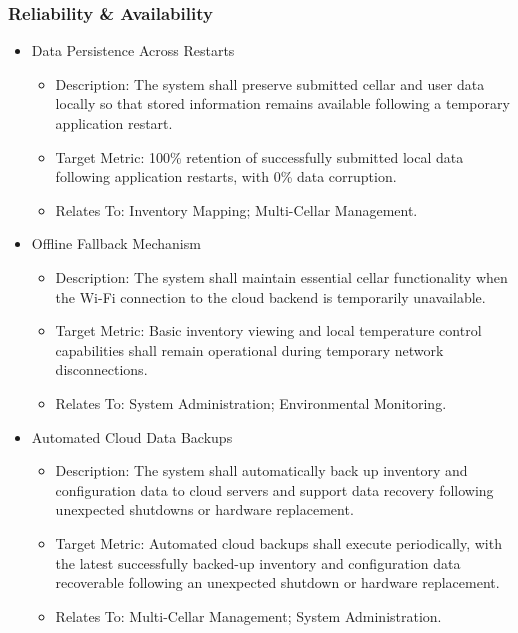 \documentclass[conference]{IEEEtran}
\begin{document}
\subsubsection{Reliability \& Availability}
\begin{itemize}
    \item Data Persistence Across Restarts
    \begin{itemize}
        \item Description: The system shall preserve submitted cellar and user data locally so that stored information remains available following a temporary application restart.
        \item Target Metric: 100\% retention of successfully submitted local data following application restarts, with 0\% data corruption.
        \item Relates To: Inventory Mapping; Multi-Cellar Management.
    \end{itemize}

    \item Offline Fallback Mechanism
    \begin{itemize}
        \item Description: The system shall maintain essential cellar functionality when the Wi-Fi connection to the cloud backend is temporarily unavailable.
        \item Target Metric: Basic inventory viewing and local temperature control capabilities shall remain operational during temporary network disconnections.
        \item Relates To: System Administration; Environmental Monitoring.
    \end{itemize}

    \item Automated Cloud Data Backups
    \begin{itemize}
        \item Description: The system shall automatically back up inventory and configuration data to cloud servers and support data recovery following unexpected shutdowns or hardware replacement.
        \item Target Metric: Automated cloud backups shall execute periodically, with the latest successfully backed-up inventory and configuration data recoverable following an unexpected shutdown or hardware replacement.
        \item Relates To: Multi-Cellar Management; System Administration.
    \end{itemize}
\end{itemize}
\end{document}
